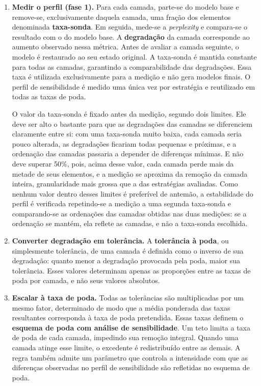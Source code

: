 \begin{enumerate}
    \item \textbf{Medir o perfil (fase 1).} Para cada camada, parte-se do modelo base e
          remove-se, exclusivamente daquela camada, uma fração dos elementos denominada
          \textbf{taxa-sonda}. Em seguida, mede-se a \textit{perplexity}
          e compara-se o resultado com o do modelo
          base. A \textbf{degradação} da camada corresponde ao aumento observado nessa
          métrica. Antes de avaliar a camada seguinte, o modelo é restaurado ao seu estado
          original. A taxa-sonda é mantida constante para todas as camadas, garantindo a
          comparabilidade das degradações. Essa taxa é utilizada exclusivamente para a
          medição e não gera modelos finais. O perfil de sensibilidade é medido uma única vez
          por estratégia e reutilizado em todas as taxas de poda.

          O valor da taxa-sonda é fixado antes da medição, segundo dois limites. Ele deve
          ser alto o bastante para que as degradações das camadas se diferenciem claramente
          entre si: com uma taxa-sonda muito baixa, cada camada seria pouco alterada, as
          degradações ficariam todas pequenas e próximas, e a ordenação das camadas passaria
          a depender de diferenças mínimas. E não deve superar 50\%, pois, acima desse valor,
          cada camada perde mais da metade de seus elementos, e a medição se aproxima da
          remoção da camada inteira, granularidade mais grossa que a das estratégias
          avaliadas. Como nenhum valor dentro desses limites é preferível de antemão, a
          estabilidade do perfil é verificada repetindo-se a medição a uma segunda
          taxa-sonda e comparando-se as ordenações das camadas obtidas nas duas medições:
          se a ordenação se mantém, ela reflete as camadas, e não a taxa-sonda escolhida.
    \item \textbf{Converter degradação em tolerância.} A \textbf{tolerância à poda}, ou
          simplesmente tolerância, de uma camada é definida como o inverso de sua
          degradação: quanto menor a degradação provocada pela poda, maior sua tolerância.
          Esses valores determinam apenas as proporções entre as taxas de poda por camada, e
          não seus valores absolutos.
    \item \textbf{Escalar à taxa de poda.} Todas as tolerâncias são multiplicadas por um
          mesmo fator, determinado de modo que a média ponderada das taxas resultantes
          corresponda à taxa de poda pretendida. Essas taxas definem o \textbf{esquema de
          poda com análise de sensibilidade}. Um teto limita a taxa de poda de cada camada,
          impedindo sua remoção integral. Quando uma camada atinge esse limite, o excedente é
          redistribuído entre as demais. A regra também admite um parâmetro que controla a
          intensidade com que as diferenças observadas no perfil de sensibilidade são
          refletidas no esquema de poda.


\end{enumerate}
